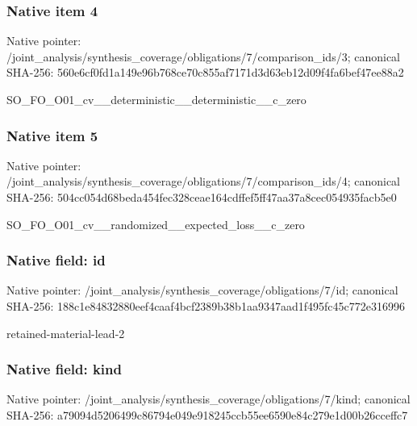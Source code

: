 \documentclass[10pt,a4paper]{article}
\begin{document}
\subsubsection{Native item 4}
Native pointer: /joint\_\allowbreak{}analysis/synthesis\_\allowbreak{}coverage/obligations/7/comparison\_\allowbreak{}ids/3; canonical SHA-256: 560e6cf0fd1a149e96b768ce70c855af7171d3d63eb12d09f4fa6bef47ee88a2

\begingroup\raggedright\sloppy SO\_\allowbreak{}FO\_\allowbreak{}O01\_\allowbreak{}cv\_\allowbreak{}\_\allowbreak{}deterministic\_\allowbreak{}\_\allowbreak{}deterministic\_\allowbreak{}\_\allowbreak{}c\_\allowbreak{}zero\par\endgroup

\subsubsection{Native item 5}
Native pointer: /joint\_\allowbreak{}analysis/synthesis\_\allowbreak{}coverage/obligations/7/comparison\_\allowbreak{}ids/4; canonical SHA-256: 504cc054d68beda454fec328ceae164cdffef5ff47aa37a8cec054935facb5e0

\begingroup\raggedright\sloppy SO\_\allowbreak{}FO\_\allowbreak{}O01\_\allowbreak{}cv\_\allowbreak{}\_\allowbreak{}randomized\_\allowbreak{}\_\allowbreak{}expected\_\allowbreak{}loss\_\allowbreak{}\_\allowbreak{}c\_\allowbreak{}zero\par\endgroup

\subsubsection{Native field: id}
Native pointer: /joint\_\allowbreak{}analysis/synthesis\_\allowbreak{}coverage/obligations/7/id; canonical SHA-256: 188c1e84832880eef4caaf4bcf2389b38b1aa9347aad1f495fc45c772e316996

\begingroup\raggedright\sloppy retained-material-lead-2\par\endgroup

\subsubsection{Native field: kind}
Native pointer: /joint\_\allowbreak{}analysis/synthesis\_\allowbreak{}coverage/obligations/7/kind; canonical SHA-256: a79094d5206499c86794e049e918245ccb55ee6590e84c279e1d00b26cceffc7
\end{document}
